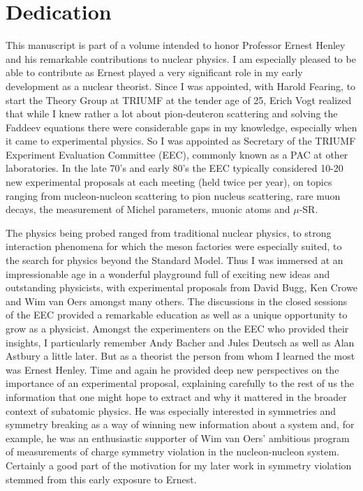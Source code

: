 \documentclass{ws-ijmpe}
\begin{document}



\section{Dedication}

This manuscript is part of a volume intended to honor Professor Ernest Henley and his remarkable 
contributions to nuclear physics. I am especially pleased to be able to contribute as Ernest played a 
very significant role in my early development as a nuclear theorist. Since I was appointed, with Harold 
Fearing, to start the Theory Group at TRIUMF at the tender age of 25, Erich Vogt realized that while I 
knew rather a lot about pion-deuteron scattering and solving the Faddeev equations there were 
considerable gaps in my knowledge, especially when it came to experimental physics. So I was appointed 
as Secretary of the TRIUMF Experiment Evaluation Committee (EEC), commonly known as 
a PAC at other laboratories. In the late 70's and early 80's the EEC typically considered 10-20 new 
experimental proposals at each meeting (held twice per year), 
on topics ranging from nucleon-nucleon scattering to pion nucleus
scattering, rare muon decays, the measurement of Michel parameters, muonic atoms and $\mu$-SR. 

The physics being probed ranged from traditional nuclear physics, to strong interaction phenomena 
for which the meson factories were especially suited, to the search for physics beyond the Standard Model. 
Thus I was immersed at an impressionable age in a wonderful playground full of exciting new ideas and 
outstanding physicists, with experimental proposals from David Bugg, Ken Crowe and Wim van Oers amongst many others. The discussions in the closed sessions of the EEC provided a remarkable education 
as well as a unique opportunity to grow as a physicist. Amongst the 
experimenters on the EEC who provided their 
insights, I particularly remember Andy Bacher and Jules Deutsch as well as Alan Astbury a little later. But as 
a theorist the person from whom I learned the most was Ernest Henley. Time and again he provided deep 
new perspectives on the importance of an experimental proposal, explaining carefully to the rest of us the 
information that one might hope to extract and why it mattered in the broader context of subatomic 
physics. He was especially interested in symmetries and symmetry breaking as a way of winning new 
information about a system and, for example, he was an enthusiastic supporter of Wim van Oers' 
ambitious program of measurements of charge symmetry violation in the nucleon-nucleon system. Certainly 
a good part of the motivation for my later work in symmetry violation stemmed from this early exposure 
to Ernest. 
\end{document}

